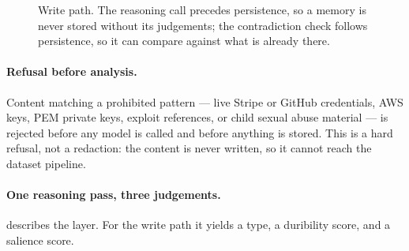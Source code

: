 \documentclass[10pt,twocolumn]{article}
\begin{document}
\begin{figure}[t]
\centering
{}
\caption{Write path. The reasoning call precedes persistence, so a memory is
never stored without its judgements; the contradiction check follows
persistence, so it can compare against what is already there.}
\label{fig:write}
\end{figure}

\paragraph{Refusal before analysis.}
Content matching a prohibited pattern --- live Stripe or GitHub credentials,
AWS keys, PEM private keys, exploit references, or child sexual abuse material
--- is rejected before any model is called and before anything is stored. This
is a hard refusal, not a redaction: the content is never written, so it cannot
reach the dataset pipeline.

\paragraph{One reasoning pass, three judgements.}
 describes the layer. For the write path it yields a type, a
duribility score, and a salience score.
\end{document}
